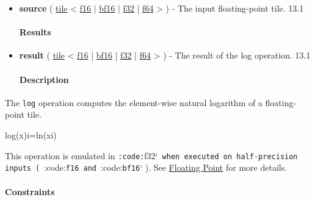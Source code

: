 \documentclass{article}
\begin{document}
\begin{itemize}
\item \textbf{source} ( \href{https://docs.nvidia.com/cuda/tile-ir/latest/sections/types.html#type-tile}{tile} < \href{https://docs.nvidia.com/cuda/tile-ir/latest/sections/types.html#subsection-element-types}{f16} | \href{https://docs.nvidia.com/cuda/tile-ir/latest/sections/types.html#subsection-element-types}{bf16} | \href{https://docs.nvidia.com/cuda/tile-ir/latest/sections/types.html#subsection-element-types}{f32} | \href{https://docs.nvidia.com/cuda/tile-ir/latest/sections/types.html#subsection-element-types}{f64} > ) - The input floating-point tile. 13.1


\paragraph{Results}

\item \textbf{result} ( \href{https://docs.nvidia.com/cuda/tile-ir/latest/sections/types.html#type-tile}{tile} < \href{https://docs.nvidia.com/cuda/tile-ir/latest/sections/types.html#subsection-element-types}{f16} | \href{https://docs.nvidia.com/cuda/tile-ir/latest/sections/types.html#subsection-element-types}{bf16} | \href{https://docs.nvidia.com/cuda/tile-ir/latest/sections/types.html#subsection-element-types}{f32} | \href{https://docs.nvidia.com/cuda/tile-ir/latest/sections/types.html#subsection-element-types}{f64} > ) - The result of the log operation. 13.1


\paragraph{Description}

\end{itemize}
The \texttt{log} operation computes the element-wise natural logarithm of a floating-point tile.


log(x)i=ln(xi)

This operation is emulated in \texttt{:code:}f32`\texttt{ when executed on half-precision inputs ( }:code:\texttt{f16}\texttt{ and }:code:\texttt{bf16}` ). See \href{https://docs.nvidia.com/cuda/tile-ir/latest/sections/operations.html#op-group-floating-point}{Floating Point} for more details.



\paragraph{Constraints}
\end{document}
